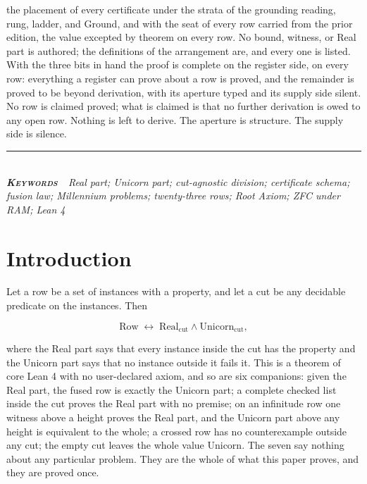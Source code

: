 \documentclass[10pt]{article}
\begin{document}
{\begin{minipage}{\textwidth}
{the placement of every certificate under the strata of the grounding
reading, rung, ladder, and Ground, and with the seat of every row
carried from the prior edition, the value excepted by theorem on every
row. No bound, witness, or Real part is authored; the definitions of the
arrangement are, and every one is listed. With the three bits in hand
the proof is complete on the register side, on every row: everything a
register can prove about a row is proved, and the remainder is proved to
be beyond derivation, with its aperture typed and its supply side
silent. No row is claimed proved; what is claimed is that no further
derivation is owed to any open row. Nothing is left to derive. The
aperture is structure. The supply side is silence.}\\[4pt]
{\color{accent}\rule{\textwidth}{0.6pt}}\\[3pt]
{\itshape\footnotesize\color{faint}\textbf{\upshape\scshape\color{deep}Keywords\ }\ Real
part; Unicorn part; cut-agnostic division; certificate schema; fusion
law; Millennium problems; twenty-three rows; Root Axiom; ZFC under RAM;
Lean 4}\\[12pt]
\end{minipage}
}
\thispagestyle{fancy}
\hypertarget{introduction}{%
\section{Introduction}\label{introduction}}

Let a row be a set of instances with a property, and let a cut be any
decidable predicate on the instances. Then

\[\mathrm{Row} \;\leftrightarrow\; \mathrm{Real}_{\mathrm{cut}} \wedge \mathrm{Unicorn}_{\mathrm{cut}},\]

where the Real part says that every instance inside the cut has the
property and the Unicorn part says that no instance outside it fails it.
This is a theorem of core Lean 4 with no user-declared axiom, and so are
six companions: given the Real part, the fused row is exactly the
Unicorn part; a complete checked list inside the cut proves the Real
part with no premise; on an infinitude row one witness above a height
proves the Real part, and the Unicorn part above any height is
equivalent to the whole; a crossed row has no counterexample outside any
cut; the empty cut leaves the whole value Unicorn. The seven say nothing
about any particular problem. They are the whole of what this paper
proves, and they are proved once.
\end{document}
